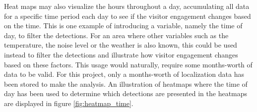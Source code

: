 Heat maps may also visualize the hours throughout a day, accumulating all data for a specific time period each day to see if the visitor engagement changes based on the time. This is one example of introducing a variable, namely the time of day, to filter the detections. For an area where other variables such as the temperature, the noise level or the weather is also known, this could be used instead to filter the detections and illustrate how visitor engagement changes based on these factors. This usage would naturally, require some months-worth of data to be valid. For this project, only a months-worth of localization data has been stored to make the analysis. An illustration of heatmaps where the time of day has been used to determine which detections are presented in the heatmaps are displayed in figure \ref{fig:heatmap_time}.

